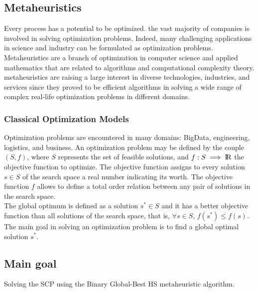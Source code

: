 \subsection{Metaheuristics}
Every process has a potential to be optimized. the vast majority of companies is involved in solving optimization problems. Indeed, many challenging applications in science and industry can be formulated as optimization problems.
Metaheuristics are a branch of optimization in computer science and applied mathematics
that are related to algorithms and computational complexity theory. metaheuristics are raising a large interest in diverse technologies, industries, and services since they proved to be efficient algorithms in solving a wide range of  complex real-life optimization problems in different domains.\\

\subsubsection{Classical Optimization Models}
Optimization problems are encountered in many domains: BigData, engineering, logistics, and business. An optimization problem may be defined by the couple $(S, f )$, where $S$ represents the set of feasible solutions, and $f : S \implies {\rm I\!R}$ the objective function to optimize. The objective function assigns to every solution
$s \in S$ of the search space a real number indicating its worth. The objective function
$f$ allows to define a total order relation between any pair of solutions in the search
space.\\

The global optimum is defined as  a solution $s^* \in S$ and it has a better objective function than all solutions of the search space, that is, $\forall  s \in  S$, $f(s^*) 	\leq f(s)$.\\

The main goal in solving an optimization problem is to find a global optimal solution $s^*$.




\subsection{Main goal}
Solving the SCP using the Binary Global-Best HS metaheuristic algorithm.

